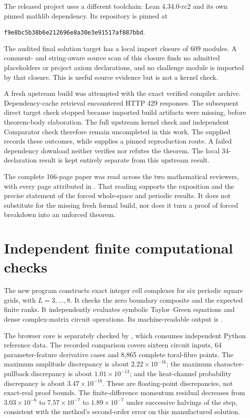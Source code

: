 The released project uses a different toolchain: Lean 4.34.0-rc2 and its own pinned mathlib dependency. Its repository is pinned at
\begin{center}\small\texttt{f9e8bc5b38b6e212696e8a30e3e91517af887bbd}.\end{center}
The audited final solution target has a local import closure of 609 modules. A comment- and string-aware source scan of this closure finds no admitted placeholders or project axiom declarations, and no challenge module is imported by that closure. This is useful source evidence but is not a kernel check.

A fresh upstream build was attempted with the exact verified compiler archive. Dependency-cache retrieval encountered HTTP 429 responses. The subsequent direct target check stopped because imported build artifacts were missing, before theorem-body elaboration. The full upstream kernel check and independent Comparator check therefore remain uncompleted in this work. The supplied  records these outcomes, while  supplies a pinned reproduction route. A failed dependency download neither verifies nor refutes the theorem. The local 34-declaration result is kept entirely separate from this upstream result.

The complete 166-page paper was read across the two mathematical reviewers, with every page attributed in . That reading supports the exposition and the precise statement of the forced whole-space and periodic results. It does not substitute for the missing fresh formal build, nor does it turn a proof of forced breakdown into an unforced theorem.

\section{Independent finite computational checks}

The new program  constructs exact integer cell complexes for six periodic square grids, with $L=3,\ldots,8$. It checks the zero boundary composite and the expected finite ranks. It independently evaluates symbolic Taylor--Green equations and dense complex-matrix circuit operations. Its machine-readable output is .

The browser core is separately checked by , which consumes independent Python reference data. The recorded comparison covers sixteen circuit inputs, 64 parameter-feature derivative cases and 8,865 complete toral-fibre points. The maximum amplitude discrepancy is about $2.22\times10^{-16}$; the maximum character-pullback discrepancy is about $1.01\times10^{-13}$; and the heat-channel probability discrepancy is about $3.47\times10^{-18}$. These are floating-point discrepancies, not exact-real proof bounds. The finite-difference momentum residual decreases from $3.03\times10^{-6}$ to $7.57\times10^{-7}$ to $1.89\times10^{-7}$ under successive halvings of the step, consistent with the method's second-order error on this manufactured solution.

